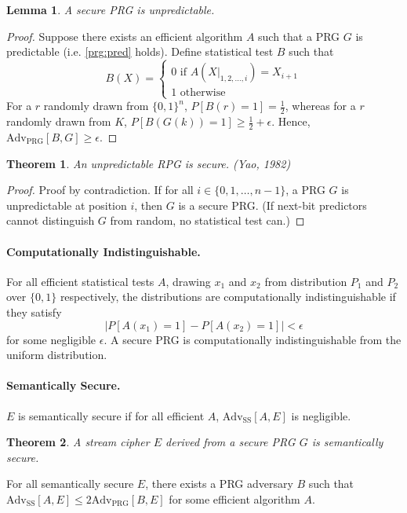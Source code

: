\documentclass{article}
\newtheorem{theorem}{Theorem}
\newtheorem{lemma}{Lemma}
\begin{document}
\begin{lemma}
  A secure PRG is unpredictable.
\end{lemma}

\begin{proof}
  Suppose there exists an efficient algorithm $A$ such that a PRG $G$ is predictable (i.e. \eqref{prg:pred} holds). Define statistical test $B$ such that \begin{equation}
    B(X) = \begin{cases}
      0 \text{ if } A(X|_{1,2,\ldots,i}) = X_{i+1} \\
      1 \text{ otherwise}
    \end{cases}
  \end{equation}
  For a $r$ randomly drawn from $\{0, 1\}^n$, $P[B(r) = 1] = \frac{1}{2}$, whereas for a $r$ randomly drawn from $K$, $P[B(G(k)) = 1] \geq \frac{1}{2} + \epsilon$. Hence, $\text{Adv}_\text{PRG}[B, G] \geq \epsilon$.
\end{proof}

\begin{theorem}
  An unpredictable RPG is secure. (Yao, 1982)
\end{theorem}

\begin{proof}
  Proof by contradiction. If for all $i \in \{0,1,\ldots,n-1\}$, a PRG $G$ is unpredictable at position $i$, then $G$ is a secure PRG. (If next-bit predictors cannot distinguish $G$ from random, no statistical test can.)
\end{proof}

\paragraph{Computationally Indistinguishable.} For all efficient statistical tests $A$, drawing $x_1$ and $x_2$ from distribution $P_1$ and $P_2$ over $\{0, 1\}$ respectively, the distributions are computationally indistinguishable if they satisfy \begin{equation}
  |P[A(x_1) = 1] - P[A(x_2) = 1]| < \epsilon
\end{equation} for some negligible $\epsilon$. A secure PRG is computationally indistinguishable from the uniform distribution.

\paragraph{Semantically Secure.} $E$ is semantically secure if for all efficient $A$, $\text{Adv}_\text{SS}[A,E]$ is negligible.

\begin{theorem}
  A stream cipher $E$ derived from a secure PRG $G$ is semantically secure.
\end{theorem}

For all semantically secure $E$, there exists a PRG adversary $B$ such that $\text{Adv}_\text{SS}[A, E] \leq 2\text{Adv}_\text{PRG}[B, E]$ for some efficient algorithm $A$.
\end{document}
